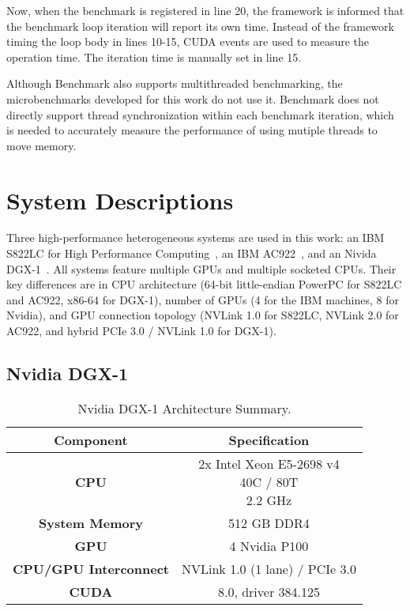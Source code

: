 Now, when the benchmark is registered in line 20, the framework is informed that the benchmark loop iteration will report its own time.
Instead of the framework timing the loop body in lines 10-15, CUDA events are used to measure the operation time.
The iteration time is manually set in line 15.

Although Benchmark also supports multithreaded benchmarking, the microbenchmarks developed for this work do not use it.
Benchmark does not directly support thread synchronization within each benchmark iteration, which is needed to accurately measure the performance of using mutiple threads to move memory.

\section{System Descriptions}
\label{sec:system-descriptions}

Three high-performance heterogeneous systems are used in this work: an IBM S822LC for High Performance Computing~\cite{caldeira2016s822lc}, an IBM AC922~\cite{caldeira2018ac922}, and an Nivida DGX-1~\cite{nvidia2017dgx1}.
All systems feature multiple GPUs and multiple socketed CPUs.
Their key differences are in CPU architecture (64-bit little-endian PowerPC for S822LC and AC922, x86-64 for DGX-1), number of GPUs (4 for the IBM machines, 8 for Nvidia), and GPU connection topology (NVLink 1.0 for S822LC, NVLink 2.0 for AC922, and hybrid PCIe 3.0 / NVLink 1.0 for DGX-1).

\subsection{Nvidia DGX-1}
\label{sec:dgx1}

\begin{table}[ht]
    \centering
    \caption[Nvidia DGX-1 Architecture Summary]{
		Nvidia DGX-1 Architecture Summary.
	}
    \label{tab:dgx1}
    \begin{tabular}{cc}
    \hline
    \textbf{Component}                     & \textbf{Specification}                                      \\ \hline
    \textbf{CPU}                  & \makecell{2x Intel Xeon E5-2698 v4 \\ 40C / 80T \\ 2.2 GHz} \\ \hline
    \textbf{System Memory}        & 512 GB DDR4                                                 \\ \hline
	\textbf{GPU}                  & 4 Nvidia P100                                               \\ \hline
	\textbf{CPU/GPU Interconnect} & NVLink 1.0 (1 lane) / PCIe 3.0                              \\ \hline
	\textbf{CUDA}                 & 8.0, driver 384.125                                         \\ \hline
    \end{tabular}
\end{table}

